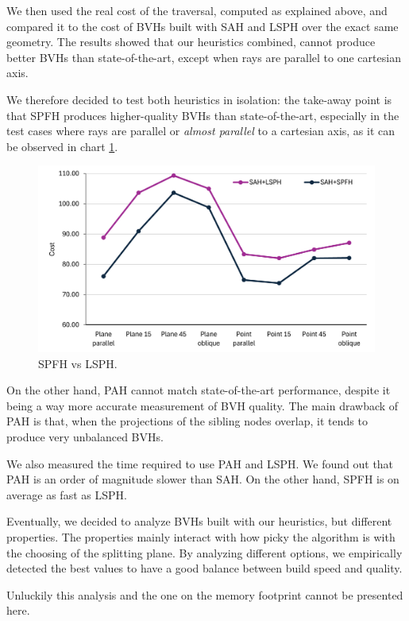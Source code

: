 \documentclass[11pt,a4paper,twocolumn]{article}
\begin{document}
We then used the real cost of the traversal, computed as explained above, and compared it to the cost of BVHs built with SAH and LSPH over the exact same geometry. The results showed that our heuristics combined, cannot produce better BVHs than state-of-the-art, except when rays are parallel to one cartesian axis.

We therefore decided to test both heuristics in isolation: the take-away point is that SPFH produces higher-quality BVHs than state-of-the-art, especially in the test cases where rays are parallel or \textit{almost parallel} to a cartesian axis, as it can be observed in chart \ref{fig:spfh_iso_chart}. 

\begin{figure}[H]
    \centering
    \includegraphics[width=\textwidth*\real{0.47}]{Images/spfh_isolation.png}
    \caption{SPFH vs LSPH.}
    \label{fig:spfh_iso_chart}
\end{figure}

On the other hand, PAH cannot match state-of-the-art performance, despite it being a way more accurate measurement of BVH quality. The main drawback of PAH is that, when the projections of the sibling nodes overlap, it tends to produce very unbalanced BVHs.

We also measured the time required to use PAH and LSPH. We found out that PAH is an order of magnitude slower than SAH. On the other hand, SPFH is on average as fast as LSPH.

Eventually, we decided to analyze BVHs built with our heuristics, but different properties. The properties mainly interact with how picky the algorithm is with the choosing of the splitting plane. By analyzing different options, we empirically detected the best values to have a good balance between build speed and quality. 

Unluckily this analysis and the one on the memory footprint cannot be presented here.
\end{document}

